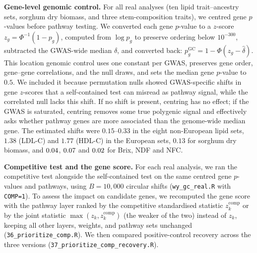 \textbf{Gene-level genomic control.} For all real analyses (ten lipid trait--ancestry sets, sorghum dry biomass, and three stem-composition traits), we centred gene $p$-values before pathway testing. We converted each gene $p$-value to a $z$-score $z_g=\Phi^{-1}(1-p_g)$, computed from $\log p_g$ to preserve ordering below $10^{-300}$, subtracted the GWAS-wide median $\hat\delta$, and converted back: $p^{\mathrm{GC}}_g=1-\Phi(z_g-\hat\delta)$. This location genomic control \citep{Devlin1999} uses one constant per GWAS, preserves gene order, gene--gene correlations, and the null draws, and sets the median gene $p$-value to $0.5$. We included it because permutation nulls showed GWAS-specific shifts in gene $z$-scores that a self-contained test can misread as pathway signal, while the correlated null lacks this shift. If no shift is present, centring has no effect; if the GWAS is saturated, centring removes some true polygenic signal and effectively asks whether pathway genes are more associated than the genome-wide median gene. The estimated shifts were $0.15$--$0.33$ in the eight non-European lipid sets, $1.38$ (LDL-C) and $1.77$ (HDL-C) in the European sets, $0.13$ for sorghum dry biomass, and $0.04$, $0.07$ and $0.02$ for Brix, NDF and NFC.

\textbf{Competitive test and the gene score.} For each real analysis, we ran the competitive test alongside the self-contained test on the same centred gene $p$-values and pathways, using $B=10{,}000$ circular shifts (\texttt{wy\_gc\_real.R} with \texttt{COMP=1}). To assess the impact on candidate genes, we recomputed the gene score with the pathway layer ranked by the competitive standardised statistic $z_k^{\mathrm{comp}}$ or by the joint statistic $\max(z_k, z_k^{\mathrm{comp}})$ (the weaker of the two) instead of $z_k$, keeping all other layers, weights, and pathway sets unchanged (\texttt{36\_prioritize\_comp.R}). We then compared positive-control recovery across the three versions (\texttt{37\_prioritize\_comp\_recovery.R}).

